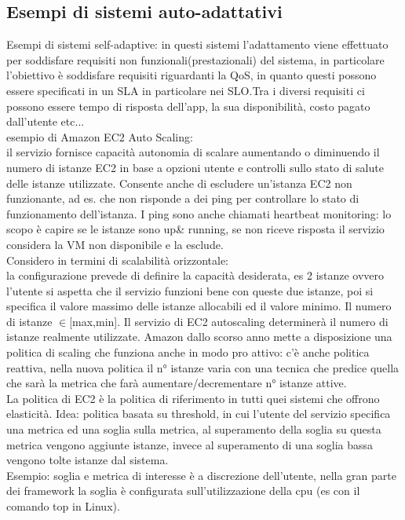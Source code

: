 \documentclass[16px]{article}
\begin{document}
\subsection{Esempi di sistemi auto-adattativi}
Esempi di sistemi self-adaptive: in questi sistemi l'adattamento viene effettuato per soddisfare requisiti non funzionali(prestazionali) del sistema, in particolare l'obiettivo è soddisfare requisiti riguardanti la QoS, in quanto questi possono essere specificati in un SLA in particolare nei SLO.Tra i diversi requisiti ci possono essere tempo di risposta dell'app, la sua disponibilità, costo pagato dall'utente etc...\\
esempio di Amazon EC2 Auto Scaling:\\
il servizio fornisce capacità autonomia di scalare aumentando o diminuendo il numero di istanze EC2 in base a opzioni utente e  controlli sullo stato di salute delle istanze utilizzate. Consente anche di escludere un'istanza EC2	non funzionante, ad es. che non risponde a dei ping per controllare lo stato di funzionamento dell'istanza. I ping sono anche chiamati heartbeat monitoring: lo scopo è capire se le istanze sono up\& running, se non riceve risposta il servizio considera la VM non disponibile e la esclude.\\Considero in termini di scalabilità orizzontale:\\
la configurazione prevede di definire la capacità desiderata, es 2 istanze ovvero l'utente si aspetta che il servizio funzioni bene con queste due istanze, poi si specifica il valore massimo delle istanze allocabili ed il valore minimo. Il numero di istanze $\in$[max,min]. Il servizio di EC2 autoscaling determinerà il numero di istanze realmente utilizzate. Amazon dallo scorso anno mette a disposizione una politica di scaling che funziona anche in modo pro attivo:
c'è anche politica reattiva, nella nuova politica il n° istanze varia con una tecnica che predice quella che sarà la metrica che farà aumentare/decrementare n° istanze attive.\\
La politica di EC2 è la politica di riferimento in tutti quei sistemi che offrono elasticità. Idea: politica basata su threshold, in cui l'utente del servizio specifica una metrica ed una soglia sulla metrica, al superamento della soglia su questa metrica vengono aggiunte istanze, invece al superamento di una soglia bassa vengono tolte istanze dal sistema.\\
Esempio: soglia e metrica di interesse è a discrezione dell'utente, nella gran parte dei framework la soglia è configurata sull'utilizzazione della cpu (es con il comando top in Linux).\\
\end{document}

